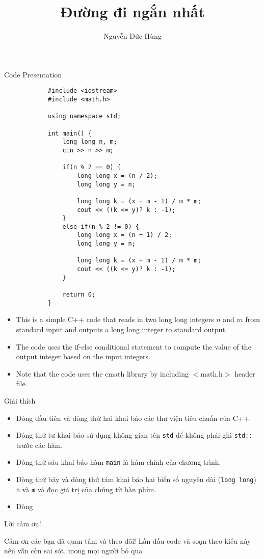 \documentclass{beamer}
\begin{document}
	
	\author{Nguyễn Đức Hùng}
	\title{Đường đi ngắn nhất}
	\begin{frame}[fragile]
		\maketitle
	\end{frame}
	
	
	\begin{frame}[fragile]{Code Presentation}
		
		\begin{lstlisting}
			#include <iostream>
			#include <math.h>
			
			using namespace std;
			
			int main() {
				long long n, m;
				cin >> n >> m;
				
				if(n % 2 == 0) {
					long long x = (n / 2);
					long long y = n;
					
					long long k = (x + m - 1) / m * m;
					cout << ((k <= y)? k : -1);
				}
				else if(n % 2 != 0) {
					long long x = (n + 1) / 2;
					long long y = n;
					
					long long k = (x + m - 1) / m * m;
					cout << ((k <= y)? k : -1);
				}
				
				return 0;
			}
		\end{lstlisting}
		
		\begin{itemize}
			\item This is a simple C++ code that reads in two long long integers $n$ and $m$ from standard input and outputs a long long integer to standard output.
			\item The code uses the if-else conditional statement to compute the value of the output integer based on the input integers.
			\item Note that the code uses the cmath library by including $<$math.h$>$ header file.
		\end{itemize}
		
	\end{frame}
	
	\begin{frame}{Giải thích}
		\begin{itemize}
			\item Dòng đầu tiên và dòng thứ hai khai báo các thư viện tiêu chuẩn của C++.
			\item Dòng thứ tư khai báo sử dụng không gian tên \texttt{std} để không phải ghi \texttt{std::} trước các hàm.
			\item Dòng thứ sáu khai báo hàm \texttt{main} là hàm chính của chương trình.
			\item Dòng thứ bảy và dòng thứ tám khai báo hai biến số nguyên dài (\texttt{long long}) \texttt{n} và \texttt{m} và đọc giá trị của chúng từ bàn phím.
			\item Dòng
		\end{itemize}
		
	\end{frame}
	
	\begin{frame}{Lời cảm ơn!}
		
		Cảm ơn các bạn đã quan tâm và theo dõi! Lần đầu code và soạn theo kiểu này nên vẫn còn sai sót, mong mọi người bỏ qua
		
	\end{frame}
\end{document}

